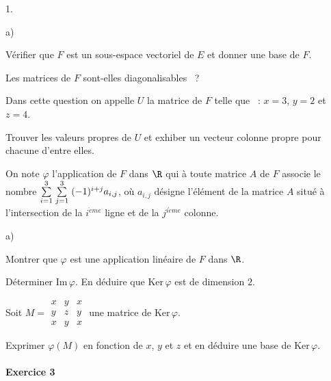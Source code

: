 \documentclass[11pt]{article}%
\begin{document}
\begin{noliste}{1.}
\begin{noliste}{a)}
 \setlength{\itemsep}{2mm}
\item Vérifier que $F$ est un sous-espace vectoriel de $E$ et donner
une
base de $F$.

\item Les matrices de $F$ sont-elles diagonalisables~ ?

\item Dans cette question on appelle $U$ la matrice de $F$ telle que~ :
$x = 3$, $y = 2$ et $z = 4$.

Trouver les valeurs propres de $U$ et exhiber un vecteur colonne propre
pour
chacune d'entre elles.
\end{noliste}

\item On note $\varphi$ l'application de $F$ dans $\R$ qui à toute
matrice $A$ de $F$ associe le nombre ${\textstyle\sum\limits_{i = 1}^{3}}\hspace{.1cm}{\textstyle\sum\limits_{j =
1}^{3}}\hspace{.1cm}(-1)^{i + j}a_{i,j}$, où $a_{i,j}$ désigne
l'élément de la matrice $A$ situé à l'intersection de la
$i^{\grave{e}me}$ ligne et de la $j^{i\grave{e}me}$ colonne.

\begin{noliste}{a)}
 \setlength{\itemsep}{2mm}
\item Montrer que $\varphi$ est une application linéaire de $F$ dans
$\R$.

\item Déterminer $\mathrm{Im}\, \varphi$. En déduire que
$\mathrm{Ker}\,
\varphi$ est de dimension $2$.

\item Soit $M = \begin{matrix}
x & y & x \\
y & z & y \\
x & y & x\end{matrix}$ une matrice de $\mathrm{Ker}\, \varphi$.

Exprimer $\varphi (M)$ en fonction de $x$, $y$ et $z$ et en déduire une
base de $\mathrm{Ker}\, \varphi$.
\end{noliste}
\end{noliste}

\vspace{0.5cm} 

\paragraph{ Exercice 3}

\hfill\\
\end{document}

